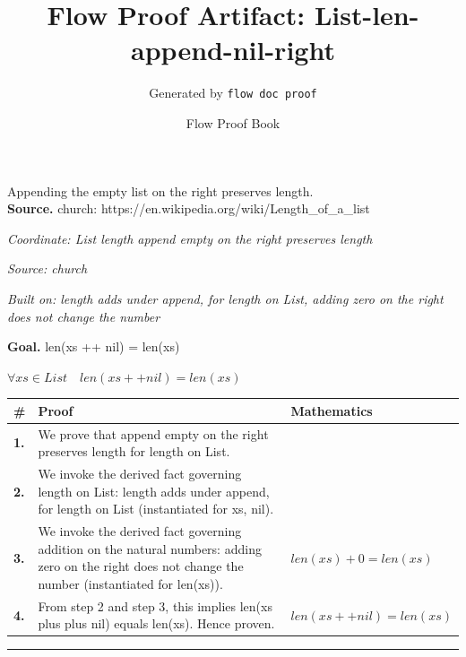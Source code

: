\documentclass[11pt]{article}
\title{Flow Proof Artifact: List-len-append-nil-right}
\author{Generated by \texttt{flow doc proof}}
\date{Flow Proof Book}
\theoremstyle{definition}
\begin{document}
\maketitle
Appending the empty list on the right preserves length.\\[0.5em]
\textbf{Source.} church: https://en.wikipedia.org/wiki/Length\_of\_a\_list\\[0.5em]
\bigskip
{}\par
\smallskip\noindent\textit{Coordinate: List \cdot length \cdot append empty on the right preserves length}\par
\smallskip\noindent\textit{Source: church}\par
\smallskip\noindent\textit{Built on: length adds under append, for length on List, adding zero on the right does not change the number}\par
\medskip
\noindent\textbf{Goal.} len(xs ++ nil) = len(xs)\par
\noindent$\displaystyle \forall xs \in List\quad len(xs ++ nil) = len(xs)$\par
\medskip
\noindent
\begin{tabular}{@{} >{\raggedright\arraybackslash}p{} >{\raggedright\arraybackslash}p{} >{\raggedleft\arraybackslash}p{} @{}}
\textbf{\#} & \textbf{Proof} & \textbf{Mathematics} \\
\midrule
\textbf{1.} & We prove that append empty on the right preserves length for length on List. & \\[0.45em]
\textbf{2.} & We invoke the derived fact governing length on List: length adds under append, for length on List (instantiated for xs, nil). & \\[0.45em]
\textbf{3.} & We invoke the derived fact governing addition on the natural numbers: adding zero on the right does not change the number (instantiated for len(xs)). & $\displaystyle len(xs) + 0 = len(xs)$ \\[0.45em]
\textbf{4.} & From step 2 and step 3, this implies len(xs plus plus nil) equals len(xs). Hence proven. & $\displaystyle len(xs ++ nil) = len(xs)$ \\[0.45em]
\bottomrule
\end{tabular}
\label{thm:List-length-append_empty_on_the_right_preserves_length}
\par\medskip\hrule
\end{document}
